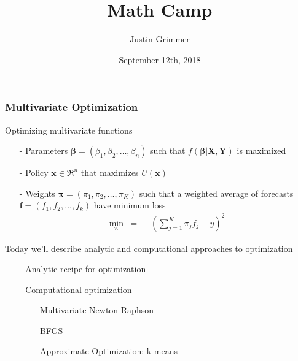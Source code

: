 \documentclass{beamer}
\title[Methodology I] %
{Math Camp}
\author{Justin Grimmer}
\institute[Stanford University]{Professor\\Department of Political Science \\Stanford University}
\date{September 12th, 2018}
\numberwithin{equation}{section}
\begin{document}
\begin{frame}
\maketitle
\end{frame}


\begin{frame}
\frametitle{Multivariate Optimization}

Optimizing multivariate functions 
\begin{itemize}
\item[-] Parameters $\boldsymbol{\beta} = (\beta_{1}, \beta_{2}, \hdots, \beta_{n} ) $ such that $f(\boldsymbol{\beta}| \boldsymbol{X}, \boldsymbol{Y})$ is maximized
\item[-] Policy $\boldsymbol{x} \in \Re^{n}$ that maximizes $U(\boldsymbol{x})$
\item[-] Weights $\boldsymbol{\pi} = (\pi_{1}, \pi_{2}, \hdots, \pi_{K})$ such that a weighted average of forecasts $\boldsymbol{f}  =  (f_{1} , f_{2}, \hdots, f_{k})$ have minimum loss 
\begin{eqnarray}
\min_{\boldsymbol{\pi}} & = & - (\sum_{j=1}^{K} \pi_{j} f_{j}  - y ) ^ 2 \nonumber 
\end{eqnarray} 
\end{itemize}

Today we'll describe analytic and computational approaches to optimization

\begin{itemize}
\item[-] Analytic recipe for optimization
\item[-] Computational optimization
\begin{itemize}
\item[-] Multivariate Newton-Raphson
\item[-] BFGS
\item[-] Approximate Optimization: k-means
\end{itemize}
\end{itemize}


\end{frame}
\end{document}
